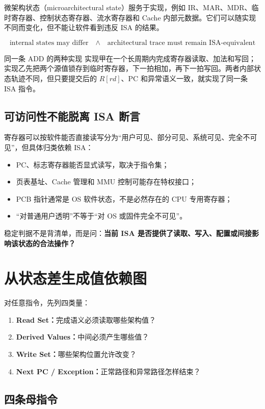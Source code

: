 \documentclass[UTF8,fontset=fandol,11pt,a4paper]{ctexart}
\newcommand{\kw}[1]{\textbf{\color{deep}#1}}
\begin{document}
微架构状态（microarchitectural state）服务于实现，例如 IR、MAR、MDR、临时寄存器、控制状态寄存器、流水寄存器和 Cache 内部元数据。它们可以随实现不同而变化，但不能让软件看到违反 ISA 的结果。

\[
\boxed{
\text{internal states may differ}
\quad\land\quad
\text{architectural trace must remain ISA-equivalent}
}
\]

\begin{examplebox}{同一条 ADD 的两种实现}
实现甲在一个长周期内完成寄存器读取、加法和写回；实现乙先把两个源值锁存到临时寄存器，下一拍相加，再下一拍写回。两者内部状态轨迹不同，但只要提交后的 $R[rd]$、PC 和异常语义一致，就实现了同一条 ISA 指令。
\end{examplebox}

\subsection{可访问性不能脱离 ISA 断言}

寄存器可以按软件能否直接读写分为“用户可见、部分可见、系统可见、完全不可见”，但具体归类依赖 ISA：
\begin{itemize}
  \item PC、标志寄存器能否显式读写，取决于指令集；
  \item 页表基址、Cache 管理和 MMU 控制可能存在特权接口；
  \item PCB 指针通常是 OS 软件状态，不是必然存在的 CPU 专用寄存器；
  \item “对普通用户透明”不等于“对 OS 或固件完全不可见”。
\end{itemize}
稳定判据不是背清单，而是问：\kw{当前 ISA 是否提供了读取、写入、配置或间接影响该状态的合法操作？}

\section{从状态差生成值依赖图}

对任意指令，先列四类量：
\begin{enumerate}
  \item \kw{Read Set：}完成语义必须读取哪些架构值？
  \item \kw{Derived Values：}中间必须产生哪些值？
  \item \kw{Write Set：}哪些架构位置允许改变？
  \item \kw{Next PC / Exception：}正常路径和异常路径怎样结束？
\end{enumerate}

\subsection{四条母指令}
\end{document}

